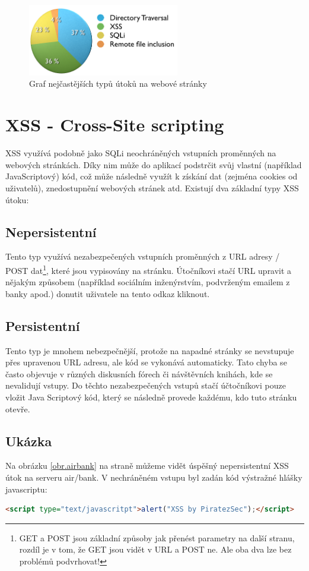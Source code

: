 \documentclass[12pt, a4paper]{report}
\begin{document}
\begin{figure}[h!]
\centerline{\includegraphics[width=250px]{./examples/chart.png}}
\caption{Graf nejčastějších typů útoků na webové stránky}
\label{chart.attack}
\end{figure}


\section{XSS - Cross-Site scripting}
XSS využívá podobně jako SQLi neochráněných vstupních proměnných na webových stránkách. Díky nim může do aplikací podstrčit svůj vlastní (například JavaScriptový) kód, což může následně využít k získání dat (zejména cookies od uživatelů), znedostupnění webových stránek atd. Existují dva základní typy XSS útoku:

\subsection{Nepersistentní}
Tento typ využívá nezabezpečených vstupních proměnných z URL adresy / POST dat\footnote{GET a POST jsou základní způsoby jak přenést parametry na další stranu, rozdíl je v tom, že GET jsou vidět v URL a POST ne. Ale oba dva lze bez problémů podvrhovat!}, které jsou vypisovány na stránku. Útočníkovi stačí URL upravit a nějakým způsobem (například sociálním inženýrstvím, podvrženým emailem z banky apod.) donutit uživatele na tento odkaz kliknout. 

\subsection{Persistentní}
Tento typ je mnohem nebezpečnější, protože na napadné stránky se nevstupuje přes upravenou URL adresu, ale kód se vykonává automaticky. Tato chyba se často objevuje v různých diskusních fórech či návštěvních knihách, kde se nevalidují vstupy. Do těchto nezabezpečených vstupů stačí účtočníkovi pouze vložit Java Scriptový kód, který se následně provede každému, kdo tuto stránku otevře. 

\subsection{Ukázka}
Na obrázku \ref{obr.airbank} na straně \pageref{obr.airbank} můžeme vidět úspěšný nepersistentní XSS útok na serveru air/bank. V nechráněném vstupu byl zadán kód výstražné hlášky javascriptu:
\begin{lstlisting}[label=some-code, language=HTML, caption=Výstražná hláška v jazyce JavaScript]
<script type="text/javascritpt">alert("XSS by PiratezSec");</script>
\end{lstlisting}
\end{document}

